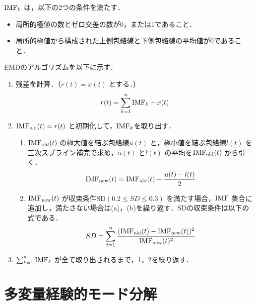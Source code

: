 ${\rm{IMF}}_{k}$ は，以下の2つの条件を満たす．
\begin{itemize}
    \item 局所的極値の数とゼロ交差の数が0，または1であること．
    \item 局所的極値から構成された上側包絡線と下側包絡線の平均値が0であること．
\end{itemize}
%
EMDのアルゴリズムを以下に示す．
\begin{enumerate}
    \item 残差を計算．（$r(t) = x(t)$ とする．）
    \begin{equation}
        r(t) = \sum_{k=1}^{n} {\rm{IMF}}_{k} - x(t)
    \end{equation}
    \item ${\rm{IMF}}_{\rm{old}}(t) = r(t)$ と初期化して，${\rm{IMF}}_{k}$を取り出す．
    \begin{enumerate}
        \item ${\rm{IMF}}_{\rm{old}}(t)$ の極大値を結ぶ包絡線$u(t)$ と，極小値を結ぶ包絡線$l(t)$ を三次スプライン補完で求め，$u(t)$ と$l(t)$ の平均を${\rm{IMF}}_{\rm{old}}(t)$ から引く．
        \begin{equation}
            {\rm{IMF}}_{\rm{new}}(t) = {\rm{IMF}}_{\rm{old}}(t) - \frac{u(t) - l(t)}{2}
        \end{equation}
        \item ${\rm{IMF}}_{\rm{new}}(t)$ が収束条件SD$(0.2 \leq SD \leq 0.3)$ を満たす場合，${\rm{IMF}}$ 集合に追加し，満たさない場合は(a)，(b)を繰り返す．SDの収束条件は以下の式である．
        \begin{equation}
            SD = \sum_{t=1}^{n} \frac{({\rm{IMF}}_{\rm{old}}(t) - {\rm{IMF}}_{\rm{new}}(t) )^2}{{\rm{IMF}}_{\rm{new}}(t)^2 }
        \end{equation}
        
    \end{enumerate}
    \item $\sum_{k=1}^{n} {\rm{IMF}}_{k}$ が全て取り出されるまで，1，2を繰り返す．
\end{enumerate}

%

\section{多変量経験的モード分解}
%
%
